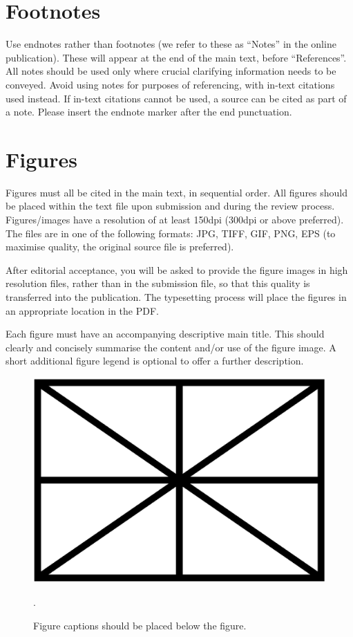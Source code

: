 \documentclass{article}
\begin{document}
\section{Footnotes}\label{sec:footnotes}

Use endnotes rather than footnotes
(we refer to these as ``Notes'' in the online publication).
These will appear at the end of the main text, before ``References''.
All notes should be used only where crucial clarifying information
needs to be conveyed.
Avoid using notes for purposes of referencing, with in-text citations used
instead.
If in-text citations cannot be used, a source can be cited as part of a note.
Please insert the endnote marker after the end punctuation.


\section{Figures}\label{sec:figures}

Figures must all be cited in the main text, in sequential order.
All figures should be placed within the text file upon submission and during
the review process. Figures/images have a resolution of at least 150dpi
(300dpi or above preferred). The files are in one of the following formats:
JPG, TIFF, GIF, PNG, EPS (to maximise quality,
the original source file is preferred).

After editorial acceptance, you will be asked to provide the figure
images in high resolution files, rather than in the submission file,
so that this quality is transferred into the publication.
The typesetting process will place the figures in an appropriate
location in the PDF.

Each figure must have an accompanying descriptive main title.
This should clearly and concisely summarise the content and/or
use of the figure image.
A short additional figure legend is optional to offer a further description.

\begin{figure}[htbp]
  \centering
  \includegraphics[width=0.9\columnwidth]{figure}
  \caption{Figure captions should be placed below the figure.}.
\label{fig:figure}
\end{figure}
\end{document}
